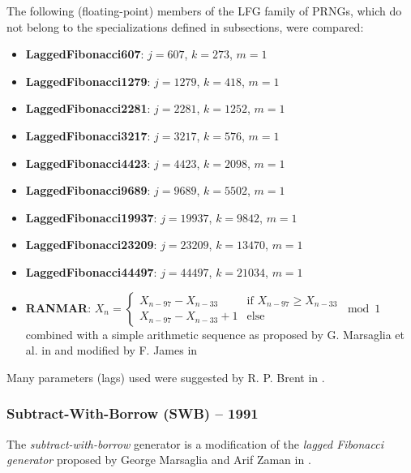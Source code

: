     The following (floating-point) members of the LFG family of PRNGs, which do not belong to the specializations defined in subsections, were compared:
    \begin{itemize}
		\itemsep0em
        \item \textbf{LaggedFibonacci607}: $j = 607$, $k = 273$, $m = 1$
        \item \textbf{LaggedFibonacci1279}: $j = 1279$, $k = 418$, $m = 1$
        \item \textbf{LaggedFibonacci2281}: $j = 2281$, $k = 1252$, $m = 1$
        \item \textbf{LaggedFibonacci3217}: $j = 3217$, $k = 576$, $m = 1$
        \item \textbf{LaggedFibonacci4423}: $j = 4423$, $k = 2098$, $m = 1$
        \item \textbf{LaggedFibonacci9689}: $j = 9689$, $k = 5502$, $m = 1$
        \item \textbf{LaggedFibonacci19937}: $j = 19937$, $k = 9842$, $m = 1$
        \item \textbf{LaggedFibonacci23209}: $j = 23209$, $k = 13470$, $m = 1$
        \item \textbf{LaggedFibonacci44497}: $j = 44497$, $k = 21034$, $m = 1$
        \item \textbf{RANMAR}: $X_n = \begin{cases}
                                          X_{n - 97} - X_{n - 33}     & \text{if } X_{n - 97} \geq X_{n - 33} \\
                                          X_{n - 97} - X_{n - 33} + 1 & \text{else}
                                      \end{cases} \bmod 1$ \\
                               combined with a simple arithmetic sequence as proposed by G. Marsaglia et al. in \cite{Marsaglia:1990} and modified by F. James in \cite{James:1990}
    \end{itemize}

    Many parameters (lags) used were suggested by R. P. Brent in \cite{Brent:1992}.

\subsubsection[Subtract-With-Borrow (SWB) -- 1991]{Subtract-With-Borrow (SWB) -- 1991} \label{subsubsec:swb}

    The \emph{subtract-with-borrow} generator is a modification of the \emph{lagged Fibonacci generator} proposed by George Marsaglia and Arif Zaman in \cite{Marsaglia:1991}.

